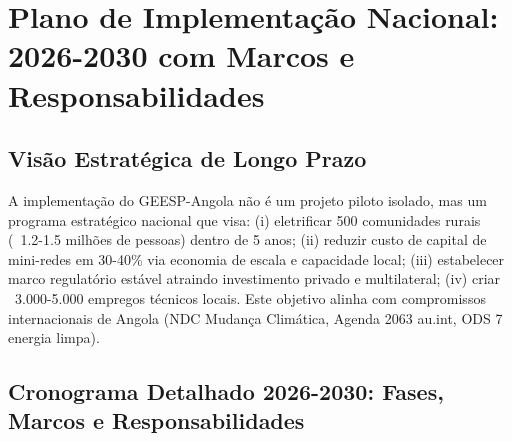 \documentclass[12pt, a4paper]{article}
\begin{document}
{{{{{{{{{{{{{\section{Plano de Implementação Nacional: 2026-2030 com Marcos e Responsabilidades}

\subsection{Visão Estratégica de Longo Prazo}

A implementação do GEESP-Angola não é um projeto piloto isolado, mas um programa estratégico nacional que visa: (i) eletrificar 500 comunidades rurais (~1.2-1.5 milhões de pessoas) dentro de 5 anos; (ii) reduzir custo de capital de mini-redes em 30-40\% via economia de escala e capacidade local; (iii) estabelecer marco regulatório estável atraindo investimento privado e multilateral; (iv) criar ~3.000-5.000 empregos técnicos locais. Este objetivo alinha com compromissos internacionais de Angola (NDC Mudança Climática, Agenda 2063 au.int, ODS 7 energia limpa).

\subsection{Cronograma Detalhado 2026-2030: Fases, Marcos e Responsabilidades}

}}}}}}}}}}}}}
\end{document}
